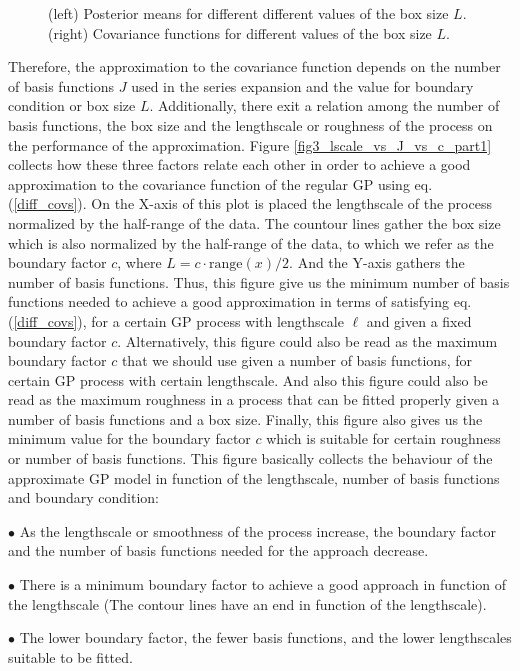 \documentclass[]{interact}
\theoremstyle{plain}%
\theoremstyle{definition}
\theoremstyle{remark}
\begin{document}
\begin{figure}[H]
\caption{(left) Posterior means for different different values of the box size $L$. (right) Covariance functions for different values of the box size $L$.}
  \label{fig2_Post_L}
\end{figure}

Therefore, the approximation to the covariance function depends on the number of basis functions $J$ used in the series expansion and the value for boundary condition or box size $L$. Additionally, there exit a relation among the number of basis functions, the box size and the lengthscale or roughness of the process on the performance of the approximation. Figure \ref{fig3_lscale_vs_J_vs_c_part1} collects how these three factors relate each other in order to achieve a good approximation to the covariance function of the regular GP using eq. (\ref{diff_covs}). On the X-axis of this plot is placed the lengthscale of the process normalized by the half-range of the data. The countour lines gather the box size which is also normalized by the half-range of the data, to which we refer as the boundary factor $c$, where $L=c \cdot \text{range}(x)/2$. And the Y-axis gathers the number of basis functions. Thus, this figure give us the minimum number of basis functions needed to achieve a good approximation in terms of satisfying eq. (\ref{diff_covs}), for a certain GP process with lengthscale $\ell$ and given a fixed boundary factor $c$. Alternatively, this figure could also be read as the maximum boundary factor $c$ that we should use given a number of basis functions, for certain GP process with certain lengthscale. And also this figure could also be read as the maximum roughness in a process that can be fitted properly given a number of basis functions and a box size. Finally, this figure also gives us the minimum value for the boundary factor $c$ which is suitable for certain roughness or number of basis functions. This figure basically collects the behaviour of the approximate GP model in function of the lengthscale, number of basis functions and boundary condition:

$\bullet$ As the lengthscale or smoothness of the process increase, the boundary factor and the number of basis functions needed for the approach decrease.

$\bullet$ There is a minimum boundary factor to achieve a good approach in function of the lengthscale (The contour lines have an end in function of the lengthscale).

$\bullet$ The lower boundary factor, the fewer basis functions, and the lower lengthscales suitable to be fitted. 
\end{document}
